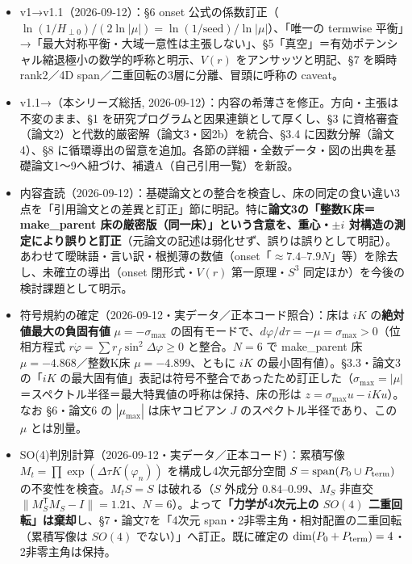 \documentclass[
  a4paper,
]{ltjsarticle}
\providecommand{\tightlist}{%
  \setlength{\itemsep}{0pt}\setlength{\parskip}{0pt}}
\begin{document}
\begin{itemize}
\tightlist
\item
  v1→v1.1（2026-09-12）：§6 onset
  公式の係数訂正（\(\ln(1/H_{\perp0})/(2\ln|\mu|)=\ln(1/\text{seed})/\ln|\mu|\)）、「唯一の
  termwise
  平衡」→「最大対称平衡・大域一意性は主張しない」、§5「真空」＝有効ポテンシャル縮退極小の数学的呼称と明示、\(V(r)\)
  をアンサッツと明記、§7 を瞬時rank2／4D
  span／二重回転の3層に分離、冒頭に呼称の caveat。
\item
  v1.1→（本シリーズ総括,
  2026-09-12）：内容の希薄さを修正。方向・主張は不変のまま、§1
  を研究プログラムと因果連鎖として厚くし、§3
  に資格審査（論文2）と代数的厳密解（論文3・図2b）を統合、§3.4
  に因数分解（論文4）、§8
  に循環導出の留意を追加。各節の詳細・全数データ・図の出典を基礎論文1〜9へ紐づけ、補遺A（自己引用一覧）を新設。
\item
  内容査読（2026-09-12）：基礎論文との整合を検査し、床の同定の食い違い3点を「引用論文との差異と訂正」節に明記。特に\textbf{論文3の「整数K床＝make\_parent
  床の厳密版（同一床）」という含意を、重心・\(\pm i\)
  対構造の測定により誤りと訂正}（元論文の記述は弱化せず、誤りは誤りとして明記）。あわせて曖昧語・言い訳・根拠薄の数値（onset「\(\approx7.4\)--\(7.9N\)」等）を除去し、未確立の導出（onset
  閉形式・\(V(r)\) 第一原理・\(S^3\)
  同定ほか）を今後の検討課題として明示。
\item
  符号規約の確定（2026-09-12・実データ／正本コード照合）：床は \(iK\)
  の\textbf{絶対値最大の負固有値} \(\mu=-\sigma_{\max}\)
  の固有モードで、\(d\varphi/d\tau=-\mu=\sigma_{\max}>0\)（位相方程式
  \(r\dot\varphi=\sum r_f\sin^2\Delta\varphi\ge0\) と整合。\(N=6\) で
  make\_parent 床 \(\mu=-4.868\)／整数K床 \(\mu=-4.899\)、ともに \(iK\)
  の最小固有値）。§3.3・論文3の「\(iK\)
  の最大固有値」表記は符号不整合であったため訂正した（\(\sigma_{\max}=|\mu|\)＝スペクトル半径＝最大特異値の呼称は保持、床の形は
  \(z=\sigma_{\max}u-iKu\)）。なお §6・論文6 の \(|\mu_{\max}|\)
  は床ヤコビアン \(J\) のスペクトル半径であり、この \(\mu\) とは別量。
\item
  SO(4)判別計算（2026-09-12・実データ／正本コード）：累積写像
  \(M_t=\prod\exp(\Delta\tau K(\varphi_n))\) を構成し4次元部分空間
  \(S=\mathrm{span}(P_0\cup P_{\rm term})\) の不変性を検査。\(M_tS=S\)
  は破れる（\(S\) 外成分 \(0.84\)--\(0.99\)、\(M_S\) 非直交
  \(\|M_S^{\mathsf T}M_S-I\|=1.21\)、\(N=6\)）。よって\textbf{「力学が4次元上の
  \(SO(4)\) 二重回転」は棄却}し、§7・論文7を「4次元
  span・2非零主角・相対配置の二重回転（累積写像は \(SO(4)\)
  でない）」へ訂正。既に確定の
  \(\dim(P_0+P_{\rm term})=4\)・2非零主角は保持。

\end{itemize}
\end{document}
